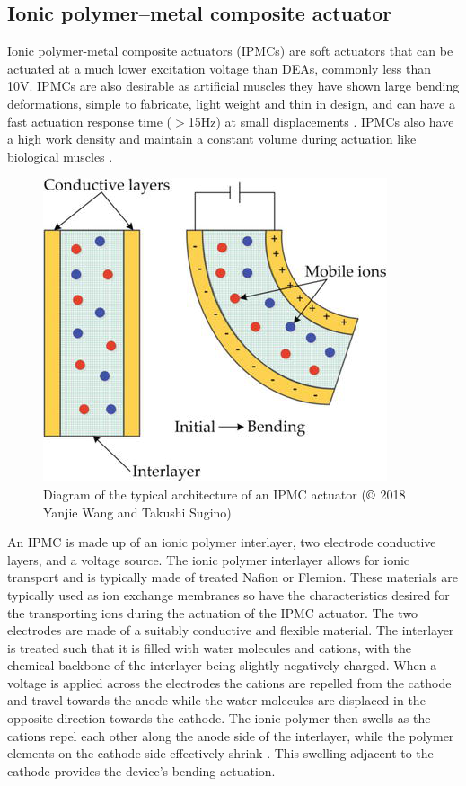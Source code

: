 \subsection{Ionic polymer–metal composite actuator}
Ionic polymer-metal composite actuators (IPMCs) are soft actuators that can be actuated at a much lower excitation voltage than DEAs, commonly less than 10V. IPMCs are also desirable as artificial muscles they have shown large bending deformations, simple to fabricate, light weight and thin in design, and can have a fast actuation response time ($>$15Hz) at small displacements \citep{Ma2020}. IPMCs also have a high work density and maintain a constant volume during actuation like biological muscles \cite{Neuhaus2020}.
\begin{figure}[H]
  \centering
  \includegraphics[width=0.5\linewidth]{Figures/IPMC.png}
  \caption{Diagram of the typical architecture of an IPMC actuator \citep{Yanjie2018} ($\copyright$ 2018 Yanjie Wang and Takushi Sugino)}
  \label{fig:Artificial Muscle_IPMC}
\end{figure}
An IPMC is made up of an ionic polymer interlayer, two electrode conductive layers, and a voltage source. The ionic polymer interlayer allows for ionic transport and is typically made of treated Nafion or Flemion. These materials are typically used as ion exchange membranes so have the characteristics desired for the transporting ions during the actuation of the IPMC actuator. The two electrodes are made of a suitably conductive and flexible material. The interlayer is treated such that it is filled with water molecules and cations, with the chemical backbone of the interlayer being slightly negatively charged. When a voltage is applied across the electrodes the cations are repelled from the cathode and travel towards the anode while the water molecules are displaced in the opposite direction towards the cathode. The ionic polymer then swells as the cations repel each other along the anode side of the interlayer, while the polymer elements on the cathode side effectively shrink \citep{Segalman1999}. This swelling adjacent to the cathode provides the device's bending actuation.


